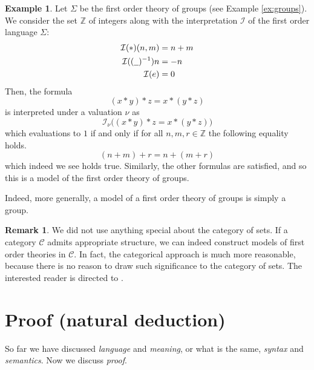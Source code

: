 \documentclass[12pt]{article}
\theoremstyle{plain}
\theoremstyle{definition}
\newtheorem{remark}[thm]{Remark}
\newtheorem{example}[thm]{Example}
\newcommand{\bb}[1]{\mathbb{#1}}
\newcommand{\call}[1]{\mathcal{#1}}
\newcommand{\und}[1]{\underline{\hspace{#1 cm}}}
\begin{document}
	\begin{example}
		Let $\Sigma$ be the first order theory of groups (see Example \ref{ex:groups}). We consider the set $\bb{Z}$ of integers along with the interpretation $\call{I}$ of the first order language $\Sigma$:
		\begin{align}
			\call{I}(\ast)(n,m) &= n + m\\
			\call{I}((\und{0.2})^{-1})n &= -n\\
			\call{I}(e) &= 0
		\end{align}
		Then, the formula
		\begin{equation}
			(x * y) * z = x * (y * z)
		\end{equation}
		is interpreted under a valuation $\nu$ as
		\begin{equation}
			\call{I}_{\nu}\big((x * y) * z = x * (y * z)\big)
		\end{equation}
		which evaluations to $1$ if and only if for all $n,m,r \in \bb{Z}$ the following equality holds.
		\begin{equation}
			(n + m) + r = n + (m + r)
		\end{equation}
		which indeed we see holds true. Similarly, the other formulas are satisfied, and so this is a model of the first order theory of groups.
		
		Indeed, more generally, a model of a first order theory of groups is simply a group.
	\end{example}

\begin{remark}
	We did not use anything special about the category of sets. If a category $\call{C}$ admits appropriate structure, we can indeed construct models of first order theories in $\call{C}$. In fact, the categorical approach is much more reasonable, because there is no reason to draw such significance to the category of sets. The interested reader is directed to \cite{TroianiColimits}.
	\end{remark}
	
	\section{Proof (natural deduction)}
	So far we have discussed \emph{language} and \emph{meaning}, or what is the same, \emph{syntax} and \emph{semantics}. Now we discuss \emph{proof}.
	
\end{document}
